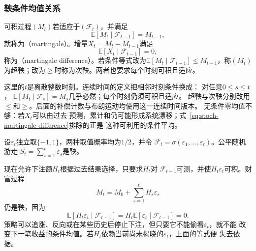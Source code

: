\subsubsection{鞅条件均值关系}
\label{sec:rv-martingales}
\begin{definition}[鞅与鞅差]
  \label{def:stoch-martingale}
可积过程$(M_t)$若适应于$(\mathcal{F}_t)$，并满足
\begin{equation}
  \mathbb{E}[M_t\mid\mathcal{F}_{t-1}]=M_{t-1},
  \label{eq:stoch-martingale-definition}
\end{equation}
就称为（martingale）。增量$X_t=M_t-M_{t-1}$满足
\begin{equation}
  \mathbb{E}[X_t\mid\mathcal{F}_{t-1}]=0,
  \label{eq:stoch-martingale-difference}
\end{equation}
称为（martingale difference）。若条件等式改为\(\mathbb E[M_t\mid\mathcal F_{t-1}]\leq M_{t-1}\)，称\((M_t)\)为超鞅；改为\(\geq\)时称为次鞅。两者也要求每个时刻可积且适应。
\end{definition}
这里的\(t\)是离散整数时刻。连续时间的定义把相邻时刻条件换成：
对任意\(0\leq s\leq t\)，
\(\mathbb E[M_t\mid\mathcal F_s]=M_s\)几乎必然；每个时刻仍须可积且适应。
超鞅与次鞅分别改用\(\leq\)和\(\geq\)。后面的补偿计数与布朗运动均使用这一连续时间版本。
无条件零均值不够：若$X_t$可以由过去
预测，累计和仍可能形成系统漂移；式~\eqref{eq:stoch-martingale-difference}排除的正是
这种可利用的条件平均。

\begin{example}[公平随机游走与按过去下注]
  \label{ex:stoch-predictable-betting}
  设$\varepsilon_t$独立取$\{-1,1\}$，两种取值概率均为$1/2$，并令
  $\mathcal{F}_t=\sigma(\varepsilon_1,\ldots,\varepsilon_t)$。公平随机游走
  $S_t=\sum_{s=1}^{t}\varepsilon_s$是鞅。

  现在允许下注额$H_t$根据过去结果选择，只要求$H_t$对
  $\mathcal{F}_{t-1}$可测，并使$H_t\varepsilon_t$可积。财富过程
  \[
    M_t=M_0+\sum_{s=1}^{t}H_s\varepsilon_s
  \]
  仍是鞅，因为
  \[
    \mathbb{E}[H_t\varepsilon_t\mid\mathcal{F}_{t-1}]
    =
    H_t\mathbb{E}[\varepsilon_t\mid\mathcal{F}_{t-1}]
    =0.
  \]
  策略可以追涨、反向或在某些历史后停止下注，但只要它不能偷看$\varepsilon_t$，就不能
  改变下一笔收益的条件均值。若$H_t$依赖当前尚未揭晓的$\varepsilon_t$，上面的等式便
  失去依据。
\end{example}

